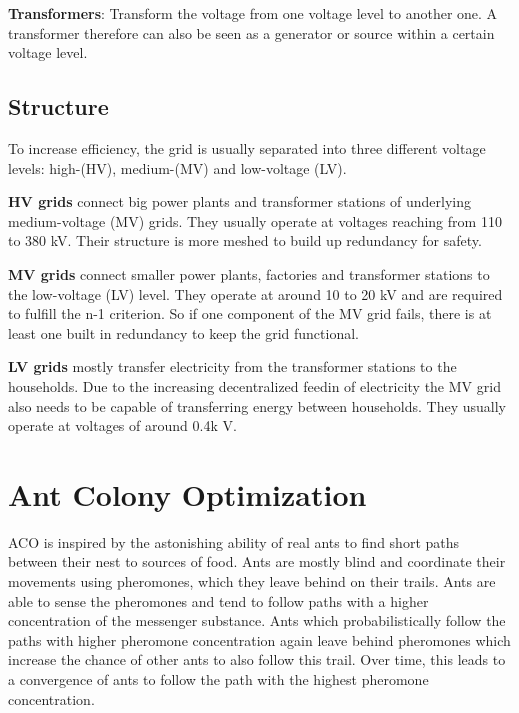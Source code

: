 \textbf{Transformers}: Transform the voltage from one voltage level to another one. A transformer therefore can also be seen as a generator or source within a certain voltage level.

\subsection{Structure}
To increase efficiency, the grid is usually separated into three different voltage levels: high-(HV), medium-(MV) and low-voltage (LV).

\textbf{HV grids} connect big power plants and transformer stations of underlying medium-voltage (MV) grids. They usually operate at voltages reaching from 110 to 380 kV. Their structure is more meshed to build up redundancy for safety.

\textbf{MV grids} connect smaller power plants, factories and transformer stations to the low-voltage (LV) level. They operate at around 10 to 20 kV and are required to fulfill the n-1 criterion. So if one component of the MV grid fails, there is at least one built in redundancy to keep the grid functional.

\textbf{LV grids} mostly transfer electricity from the transformer stations to the households. Due to the increasing decentralized feedin of electricity the MV grid also needs to be capable of transferring energy between households. They usually operate at voltages of around 0.4k V.




\section{Ant Colony Optimization}
ACO is inspired by the astonishing ability of real ants to find short paths between their nest to sources of food. Ants are mostly blind and coordinate their movements using pheromones, which they leave behind on their trails. Ants are able to sense the pheromones and tend to follow paths with a higher concentration of the messenger substance. Ants which probabilistically follow the paths with higher pheromone concentration again leave behind pheromones which increase the chance of other ants to also follow this trail. Over time, this leads to a convergence of ants to follow the path with the highest pheromone concentration.

